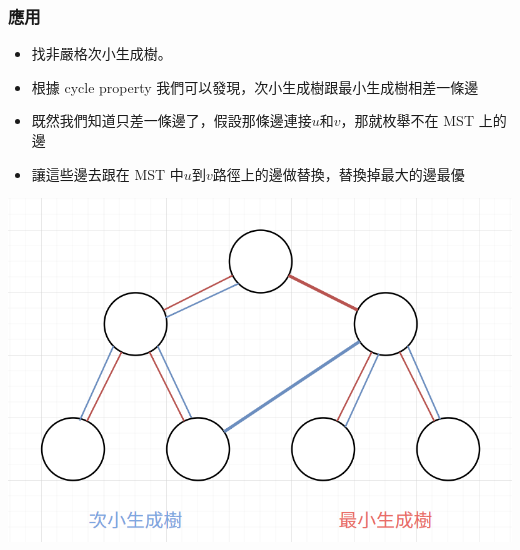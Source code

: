\documentclass[aspectratio=169]{beamer}
\begin{document}
    \begin{frame}
        \frametitle{應用}
        \begin{itemize}
            \item 找非嚴格次小生成樹。
            \item<2-> 根據 cycle property 我們可以發現，次小生成樹跟最小生成樹相差一條邊
            \item<3-> 既然我們知道只差一條邊了，假設那條邊連接$u$和$v$，那就枚舉不在 MST 上的邊
            \item<3->讓這些邊去跟在 MST 中$u$到$v$路徑上的邊做替換，替換掉最大的邊最優
        \end{itemize}
        \begin{center}
            \includegraphics[scale=0.3]{images/smst.png}
        \end{center}
    \end{frame}
    
\end{document}
